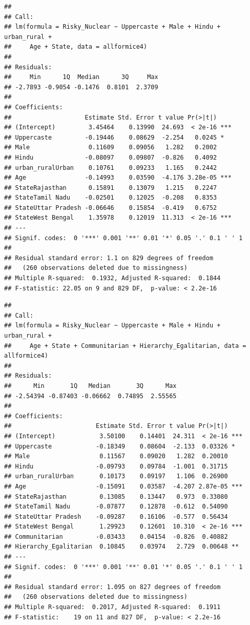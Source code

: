 \documentclass[
]{article}
\begin{document}
\begin{verbatim}
## 
## Call:
## lm(formula = Risky_Nuclear ~ Uppercaste + Male + Hindu + urban_rural + 
##     Age + State, data = allformice4)
## 
## Residuals:
##     Min      1Q  Median      3Q     Max 
## -2.7893 -0.9054 -0.1476  0.8101  2.3709 
## 
## Coefficients:
##                    Estimate Std. Error t value Pr(>|t|)    
## (Intercept)         3.45464    0.13990  24.693  < 2e-16 ***
## Uppercaste         -0.19446    0.08629  -2.254   0.0245 *  
## Male                0.11609    0.09056   1.282   0.2002    
## Hindu              -0.08097    0.09807  -0.826   0.4092    
## urban_ruralUrban    0.10761    0.09233   1.165   0.2442    
## Age                -0.14993    0.03590  -4.176 3.28e-05 ***
## StateRajasthan      0.15891    0.13079   1.215   0.2247    
## StateTamil Nadu    -0.02501    0.12025  -0.208   0.8353    
## StateUttar Pradesh -0.06646    0.15854  -0.419   0.6752    
## StateWest Bengal    1.35978    0.12019  11.313  < 2e-16 ***
## ---
## Signif. codes:  0 '***' 0.001 '**' 0.01 '*' 0.05 '.' 0.1 ' ' 1
## 
## Residual standard error: 1.1 on 829 degrees of freedom
##   (260 observations deleted due to missingness)
## Multiple R-squared:  0.1932, Adjusted R-squared:  0.1844 
## F-statistic: 22.05 on 9 and 829 DF,  p-value: < 2.2e-16
\end{verbatim}

\begin{verbatim}
## 
## Call:
## lm(formula = Risky_Nuclear ~ Uppercaste + Male + Hindu + urban_rural + 
##     Age + State + Communitarian + Hierarchy_Egalitarian, data = allformice4)
## 
## Residuals:
##      Min       1Q   Median       3Q      Max 
## -2.54394 -0.87403 -0.06662  0.74895  2.55565 
## 
## Coefficients:
##                       Estimate Std. Error t value Pr(>|t|)    
## (Intercept)            3.50100    0.14401  24.311  < 2e-16 ***
## Uppercaste            -0.18349    0.08604  -2.133  0.03326 *  
## Male                   0.11567    0.09020   1.282  0.20010    
## Hindu                 -0.09793    0.09784  -1.001  0.31715    
## urban_ruralUrban       0.10173    0.09197   1.106  0.26900    
## Age                   -0.15091    0.03587  -4.207 2.87e-05 ***
## StateRajasthan         0.13085    0.13447   0.973  0.33080    
## StateTamil Nadu       -0.07877    0.12878  -0.612  0.54090    
## StateUttar Pradesh    -0.09287    0.16106  -0.577  0.56434    
## StateWest Bengal       1.29923    0.12601  10.310  < 2e-16 ***
## Communitarian         -0.03433    0.04154  -0.826  0.40882    
## Hierarchy_Egalitarian  0.10845    0.03974   2.729  0.00648 ** 
## ---
## Signif. codes:  0 '***' 0.001 '**' 0.01 '*' 0.05 '.' 0.1 ' ' 1
## 
## Residual standard error: 1.095 on 827 degrees of freedom
##   (260 observations deleted due to missingness)
## Multiple R-squared:  0.2017, Adjusted R-squared:  0.1911 
## F-statistic:    19 on 11 and 827 DF,  p-value: < 2.2e-16
\end{verbatim}
\end{document}
